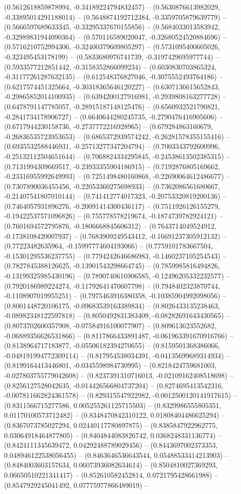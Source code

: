 (0.5612618859878994, -0.34189224794832457) -- (0.5630876613982029, -0.33895014291188014) -- (0.5648874192712384, -0.3359705879639779) -- (0.5666597689633345, -0.33295337670155856) -- (0.5684033013583942, -0.32989831944090364) -- (0.570116589020047, -0.32680524520884696) -- (0.5716210752994306, -0.32400379609805297) -- (0.5731095400605026, -0.323495453178199) -- (0.5833680976741739, -0.3197429695977744) -- (0.5933577212851442, -0.3158352866099234) -- (0.6030830703865324, -0.31177261287632135) -- (0.612548376827046, -0.3075552493764186) -- (0.6217574451325664, -0.30318365646120227) -- (0.6307136615652843, -0.29865852014100935) -- (0.6394200127916981, -0.2939808163277728) -- (0.6478791147785057, -0.28915187148125476) -- (0.6560932521790821, -0.2841734178906727) -- (0.6640644280245735, -0.2790476416905606) -- (0.6717944230158736, -0.2737772216928965) -- (0.679284863160679, -0.26836535723953653) -- (0.6865372939574242, -0.26281578355155416) -- (0.6935532588446931, -0.25713277347204794) -- (0.7003343792600996, -0.25132112504651644) -- (0.7068824334295845, -0.24538613502385315) -- (0.7131994309669517, -0.23933355904186915) -- (0.7192876805169662, -0.23316955992649993) -- (0.7251498480160868, -0.22690064612486677) -- (0.7307890036455456, -0.22053360275698933) -- (0.7362086561680667, -0.21407541807010144) -- (0.741412774017323, -0.20753320819200136) -- (0.7464057931896276, -0.20091414300436117) -- (0.7511926126155279, -0.19422537571096826) -- (0.755778578219674, -0.1874739782924121) -- (0.7601694572795876, -0.1806668845606312) -- (0.7643714049524912, -0.1738108420007937) -- (0.7683909249543412, -0.16691237305912132) -- (0.77223482635964, -0.15997774604193066) -- (0.7759101783667504, -0.15301295536237755) -- (0.7794242646686983, -0.1460237105254543) -- (0.7827845388126625, -0.13901543298664745) -- (0.7859985816494826, -0.13199325985430196) -- (0.7890740616906585, -0.12496205332232577) -- (0.7920186989224274, -0.11792641470607798) -- (0.7948402323870744, -0.1108907019955251) -- (0.7975463916380358, -0.10385904992098056) -- (0.8001448720106175, -0.09683539163389834) -- (0.8026433135238463, -0.08982348122597818) -- (0.8050492831383409, -0.08282691643430565) -- (0.8073702600357908, -0.07584916100077907) -- (0.809613623552682, -0.06889356626531866) -- (0.8117866433891487, -0.061963391670916766) -- (0.8138964717183877, -0.05506182394270655) -- (0.8159501368386066, -0.048191994772309114) -- (0.817954538034391, -0.04135699689314934) -- (0.8199164413446801, -0.0345598984730995) -- (0.8218424759681003, -0.027803755779042608) -- (0.8237391310716013, -0.02109162408518698) -- (0.8256127528042635, -0.014426566804737204) -- (0.8274695413542316, -0.007811662824361578) -- (0.829315547922982, -0.0012500120141917615) -- (0.8311566715277586, 0.005255261125715503) -- (0.8329986555805351, 0.01170100573712482) -- (0.8348470842310122, 0.01808404486625294) -- (0.8367073785027294, 0.02440117780897875) -- (0.8385847922962775, 0.03064918464877805) -- (0.8404844083826742, 0.0368248331136774) -- (0.8424111345639472, 0.04292488789029456) -- (0.8443697002373353, 0.048946122538056455) -- (0.8463646536643544, 0.05488533414213903) -- (0.8484003603157634, 0.06073936082634614) -- (0.8504810027369293, 0.06650510221341417) -- (0.852610582452814, 0.0721795428661988) -- (0.8547929245041492, 0.07775977866489019) -- 